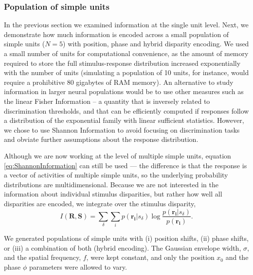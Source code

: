 \subsubsection*{Population of simple units}

In the previous section we examined information at the single unit level. Next, we demonstrate how much information is encoded across a small population of simple units ($N=5$) with position, phase and hybrid disparity encoding. We used a small number of units for computational convenience, as the amount of memory required to store the full stimulus-response distribution increased exponentially with the number of units (simulating a population of 10 units, for instance, would require a prohibitive 80 gigabytes of RAM memory). An alternative to study information in larger neural populations would be to use other measures such as the linear Fisher Information -- a quantity that is inversely related to discrimination thresholds, and that can be efficiently computed if responses follow a distribution of the exponential family with linear sufficient statistics\cite{Moreno-Bote:2014hy}. However, we chose to use Shannon Information to avoid focusing on discrimination tasks and obviate further assumptions about the response distribution. 

Although we are now working at the level of multiple simple units, equation \ref{eq:ShannonInformation} can still be used --- the difference is that the response is a vector of activities of multiple simple units, so the underlying probability distributions are multidimensional. Because we are not interested in the information about individual stimulus disparities, but rather how well all disparities are encoded, we integrate over the stimulus disparity,
\begin{equation}
  I(\mathbf{R}, \mathbf{S}) = \sum_\delta \sum_i p(\mathbf{r_i}|s_\delta) \log \frac{p(\mathbf{r_i}|s_\delta)}{p(\mathbf{r_i})}.
  \label{eq:ShannonInformationVector}
\end{equation}

We generated populations of simple units with (i) position shifts, (ii) phase shifts, or (iii) a combination of both (hybrid encoding). The Gaussian envelope width, $\sigma$, and the spatial frequency, $f$, were kept constant, and only the position $x_0$ and the phase $\phi$ parameters were allowed to vary. 

